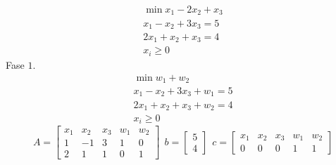 \Es
\begin{gather*}
\min x_{1} -2x_{2} +x_{3}\\
x_{1} -x_{2} +3x_{3} =5\\
2x_{1} +x_{2} +x_{3} =4\\
x_{i} \geq 0
\end{gather*}
Fase $1$.
\begin{gather*}
\min w_{1} +w_{2}\\
x_{1} -x_{2} +3x_{3} +w_{1} =5\\
2x_{1} +x_{2} +x_{3} +w_{2} =4\\
x_{i} \geq 0
\end{gather*}
\begin{equation*}
A=\begin{bmatrix}
x_{1} & x_{2} & x_{3} & w_{1} & w_{2}\\
1 & -1 & 3 & 1 & 0\\
2 & 1 & 1 & 0 & 1
\end{bmatrix} \ \ b=\begin{bmatrix}
5\\
4
\end{bmatrix} \ \ c=\begin{bmatrix}
x_{1} & x_{2} & x_{3} & w_{1} & w_{2}\\
0 & 0 & 0 & 1 & 1
\end{bmatrix}
\end{equation*}
